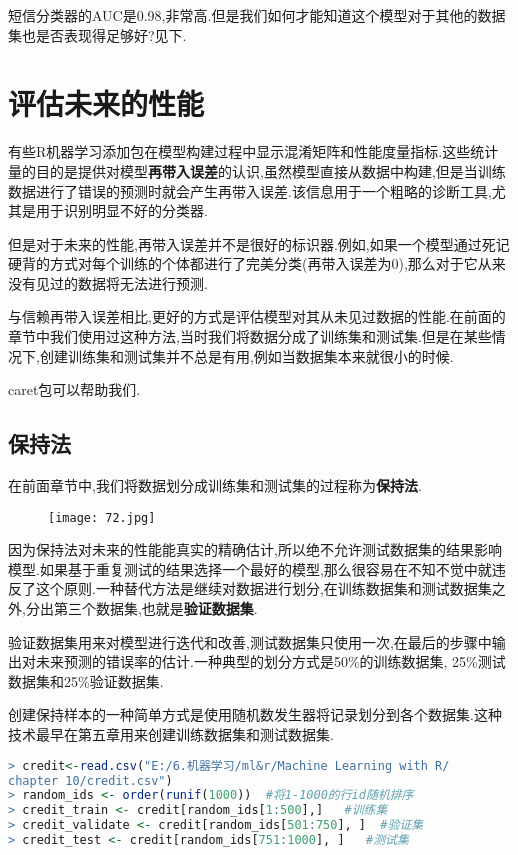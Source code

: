 \documentclass[11pt,a4paper,oneside]{book}
\begin{document}
短信分类器的AUC是0.98,非常高.但是我们如何才能知道这个模型对于其他的数据集也是否表现得足够好?见下.

\section{评估未来的性能}

有些R机器学习添加包在模型构建过程中显示混淆矩阵和性能度量指标.这些统计量的目的是提供对模型\textbf{再带入误差}的认识,虽然模型直接从数据中构建,但是当训练数据进行了错误的预测时就会产生再带入误差.该信息用于一个粗略的诊断工具,尤其是用于识别明显不好的分类器.

但是对于未来的性能,再带入误差并不是很好的标识器.例如,如果一个模型通过死记硬背的方式对每个训练的个体都进行了完美分类(再带入误差为0),那么对于它从来没有见过的数据将无法进行预测.

与信赖再带入误差相比,更好的方式是评估模型对其从未见过数据的性能.在前面的章节中我们使用过这种方法,当时我们将数据分成了训练集和测试集.但是在某些情况下,创建训练集和测试集并不总是有用,例如当数据集本来就很小的时候.

caret包可以帮助我们.

\subsection{保持法}
在前面章节中,我们将数据划分成训练集和测试集的过程称为\textbf{保持法}.
\begin{figure}[H]
	\centering
	\texttt{[image: 72.jpg]}
\end{figure}

因为保持法对未来的性能能真实的精确估计,所以绝不允许测试数据集的结果影响模型.如果基于重复测试的结果选择一个最好的模型,那么很容易在不知不觉中就违反了这个原则.一种替代方法是继续对数据进行划分,在训练数据集和测试数据集之外,分出第三个数据集,也就是\textbf{验证数据集}.

验证数据集用来对模型进行迭代和改善,测试数据集只使用一次,在最后的步骤中输出对未来预测的错误率的估计.一种典型的划分方式是50\%的训练数据集, 25\%测试数据集和25\%验证数据集.

创建保持样本的一种简单方式是使用随机数发生器将记录划分到各个数据集.这种技术最早在第五章用来创建训练数据集和测试数据集.
\begin{lstlisting}[language=r]
> credit<-read.csv("E:/6.机器学习/ml&r/Machine Learning with R/
chapter 10/credit.csv")
> random_ids <- order(runif(1000))  #将1-1000的行id随机排序
> credit_train <- credit[random_ids[1:500],]   #训练集
> credit_validate <- credit[random_ids[501:750], ]  #验证集
> credit_test <- credit[random_ids[751:1000], ]   #测试集
\end{lstlisting}
\end{document}
